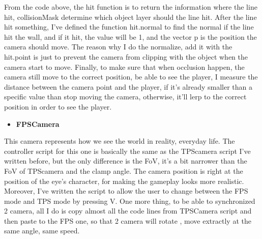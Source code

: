\documentclass[a4paper, 13pt]{extarticle}
\begin{document}
From the code above, the hit function is to return the information where the line hit, collisionMask determine which object layer should the line hit. After the line hit something, I've defined the function hit.normal to find the normal if the line hit the wall, and if it hit, the value will be 1, and the vector p is the position the camera should move. The reason why I do the normalize, add it with the hit.point is just to prevent the camera from clipping with the object when the camera start to move. Finally, to make sure that when occlusion happen, the camera still move to the correct position, be able to see the player, I measure the distance between the camera point and the player, if it's already smaller than a specific value than stop moving the camera, otherwise, it'll lerp to the correct position in order to see the player.  
\begin{itemize}
	\item \bfseries FPSCamera 	 	
\end{itemize}
	This camera represents how we see the world in reality, everyday life. The controller script for this one is basically the same as the TPScamera script I've written before, but the only difference is the FoV, it's a bit narrower than the FoV of TPScamera and the clamp angle. The camera position is right at the position of the eye's character, for making the gameplay looks more realistic. Moreover, I've written the script to allow the user to change between the FPS mode and TPS mode by pressing V. One more thing, to be able to synchronized 2 camera, all I do is copy almost all the code lines from TPSCamera script and then paste to the FPS one, so that 2 camera will rotate , move extractly at the same angle, same speed. 
\end{document}
